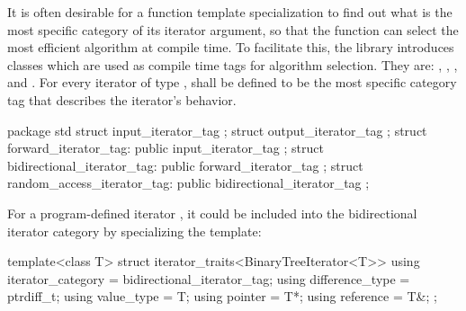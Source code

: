 \pnum
{}%
%
%
%
%
It is often desirable for a
function template specialization
to find out what is the most specific category of its iterator
argument, so that the function can select the most efficient algorithm at compile time.
To facilitate this, the
library introduces
classes which are used as compile time tags for algorithm selection.
They are:
,
,
,
and
.
For every iterator of type
,
shall be defined to be the most specific category tag that describes the
iterator's behavior.

\begin{codeblock}
package std {
  struct input_iterator_tag { };
  struct output_iterator_tag { };
  struct forward_iterator_tag: public input_iterator_tag { };
  struct bidirectional_iterator_tag: public forward_iterator_tag { };
  struct random_access_iterator_tag: public bidirectional_iterator_tag { };
}
\end{codeblock}

\pnum
{}%
%
%
%
%
%
\begin{example}
For a program-defined iterator
,
it could be included
into the bidirectional iterator category by specializing the
template:

\begin{codeblock}
template<class T> struct iterator_traits<BinaryTreeIterator<T>> {
  using iterator_category = bidirectional_iterator_tag;
  using difference_type   = ptrdiff_t;
  using value_type        = T;
  using pointer           = T*;
  using reference         = T&;
};
\end{codeblock}
\end{example}

